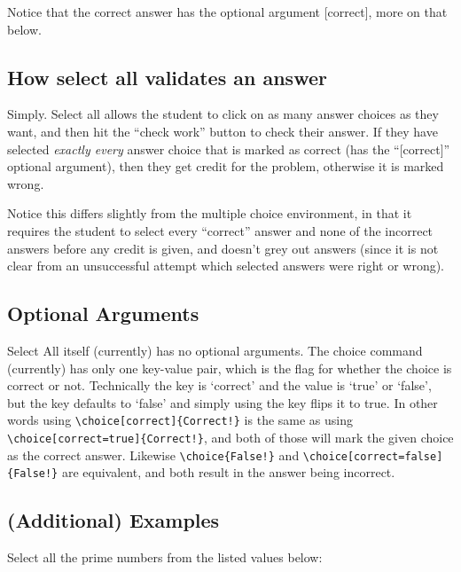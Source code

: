 \documentclass{ximera}
\begin{document}
        Notice that the correct answer has the optional argument [correct], more on that below.
            
            
        \subsection*{How select all validates an answer}
        
            Simply. Select all allows the student to click on as many answer choices as they want, and then hit the ``check work'' button to check their answer. If they have selected \textit{exactly every} answer choice that is marked as correct (has the ``[correct]'' optional argument), then they get credit for the problem, otherwise it is marked wrong. 
            
            Notice this differs slightly from the multiple choice environment, in that it requires the student to select every ``correct'' answer and none of the incorrect answers before any credit is given, and doesn't grey out answers (since it is not clear from an unsuccessful attempt which selected answers were right or wrong).
            
    \subsection*{Optional Arguments}
    
        Select All itself (currently) has no optional arguments. The choice command (currently) has only one key-value pair, which is the flag for whether the choice is correct or not. Technically the key is `correct' and the value is `true' or `false', but the key defaults to `false' and simply using the key flips it to true. In other words using \verb|\choice[correct]{Correct!}| is the same as using \verb|\choice[correct=true]{Correct!}|, and both of those will mark the given choice as the correct answer. Likewise \verb|\choice{False!}| and \verb|\choice[correct=false]{False!}| are equivalent, and both result in the answer being incorrect.
        
    \subsection*{(Additional) Examples}
    
        \begin{problem}
            Select all the prime numbers from the listed values below:
            \begin{selectAll}
            \end{selectAll}
        \end{problem}
        
\end{document}
